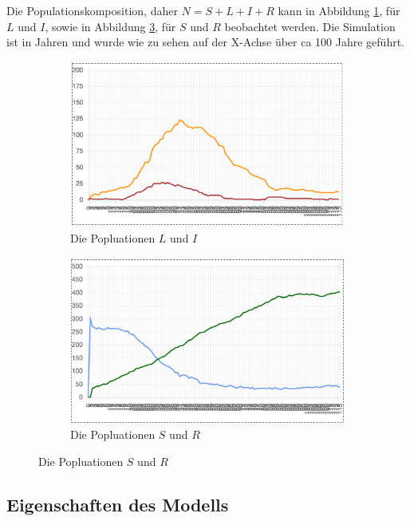 \documentclass[paper=a4, fontsize=11pt, ngerman, abstract=on]{scrartcl}
\numberwithin{equation}{section} %
\numberwithin{figure}{section} %
\numberwithin{table}{section} %
\begin{document}
Die Populationskomposition, daher $N = S + L + I + R$ kann in Abbildung \ref{fig:l-i-population}, für $L$ und $I$, sowie in Abbildung \ref{fig:s-r-population}, für $S$ und $R$ beobachtet werden. Die Simulation ist in Jahren und wurde wie zu sehen auf der X-Achse über ca 100 Jahre geführt.

\begin{figure}[ht]
  \centering
  \begin{subfigure}{.5\textwidth}
    \centering
    \includegraphics[width=.99\linewidth]{images/l-i-population}
    \caption{Die Popluationen $L$ und $I$}
    \label{fig:l-i-population}
  \end{subfigure}%
  \begin{subfigure}{.5\textwidth}
    \centering
    \includegraphics[width=.99\linewidth]{images/s-r-population}
    \caption{Die Popluationen $S$ und $R$}
    \label{fig:s-r-population}
  \end{subfigure}
\end{figure}

\subsection{Eigenschaften des Modells}
\end{document}

